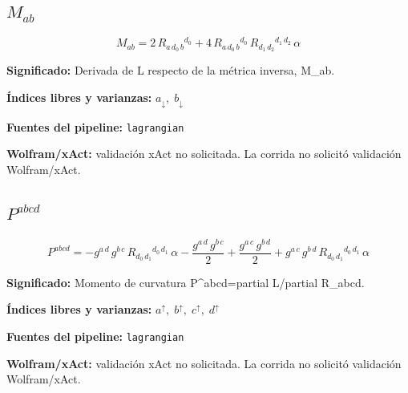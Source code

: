 \documentclass[11pt]{article}
\begin{document}
\subsection*{$ M_{ab} $}
\begin{dmath*}[breakdepth={5}]
M_{ab} = 2\,R{}_{a\,d_{0}\,b}{}^{d_{0}} + 4\,R{}_{a\,d_{0}\,b}{}^{d_{0}}\,R{}_{d_{1}\,d_{2}}{}^{d_{1}\,d_{2}}\,\alpha
\end{dmath*}
\par\vspace{1.2\baselineskip}\noindent
\begin{minipage}{\linewidth}
\textbf{Significado:} Derivada de L respecto de la métrica inversa, M\_ab.\par
\textbf{Índices libres y varianzas:} $ a_{\downarrow},\;b_{\downarrow} $\par
\textbf{Fuentes del pipeline:} \texttt{lagrangian}\par
\textbf{Wolfram/xAct:} validación xAct no solicitada. La corrida no solicitó validación Wolfram/xAct.\par
\end{minipage}
\subsection*{$ P^{abcd} $}
\begin{dmath*}[breakdepth={5}]
P^{abcd} = -g{}^{a\,d}\,g{}^{b\,c}\,R{}_{d_{0}\,d_{1}}{}^{d_{0}\,d_{1}}\,\alpha - \frac{g{}^{a\,d}\,g{}^{b\,c}}{2} + \frac{g{}^{a\,c}\,g{}^{b\,d}}{2} + g{}^{a\,c}\,g{}^{b\,d}\,R{}_{d_{0}\,d_{1}}{}^{d_{0}\,d_{1}}\,\alpha
\end{dmath*}
\par\vspace{1.2\baselineskip}\noindent
\begin{minipage}{\linewidth}
\textbf{Significado:} Momento de curvatura P^{abcd}=partial L/partial R\_abcd.\par
\textbf{Índices libres y varianzas:} $ a^{\uparrow},\;b^{\uparrow},\;c^{\uparrow},\;d^{\uparrow} $\par
\textbf{Fuentes del pipeline:} \texttt{lagrangian}\par
\textbf{Wolfram/xAct:} validación xAct no solicitada. La corrida no solicitó validación Wolfram/xAct.\par
\end{minipage}
\end{document}

